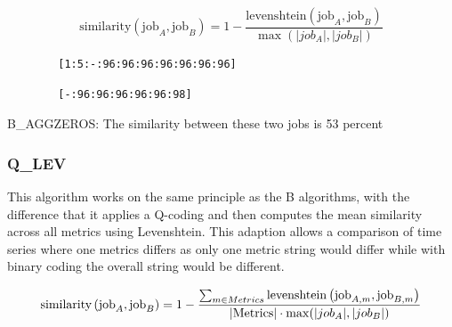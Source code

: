 \documentclass{jhps}
\begin{document}
\begin{equation}
	\text{similarity} \left(\text{job}_{A},\text{job}_{B} \right) =1- \frac{\text{levenshtein} \left(\text{job}_{A},\text{job}_{B} \right) }{\max \left( |job_{A}|,|job_{B}| \right) } \label{eq:sim:bin_aggzeros}
\end{equation}


\begin{listing}
	\noindent\begin{minipage}{0.49\textwidth}
		\begin{lstlisting}
		[1:5:-:96:96:96:96:96:96:96]
		\end{lstlisting}
		\vspace{-2em}
		\label{lst:sim:bin_aggzeros:job_a}
	\end{minipage}
	\noindent\begin{minipage}{0.49\textwidth}
		\begin{lstlisting}
		[-:96:96:96:96:96:98]
		\end{lstlisting}
		\vspace{-2em}
		\label{lst:sim:bin_aggzeros:job_b}
	\end{minipage}
	\caption{B\_AGGZEROS: The similarity between these two jobs is 53 percent}
	\label{lst:sim:bin_aggzeros}
\end{listing}

  \subsubsection{Q\_LEV}
This algorithm works on the same principle as the B algorithms, with the difference that it applies a Q-coding and then computes the mean similarity across all metrics using Levenshtein.
This adaption allows a comparison of time series where one metrics differs as only one metric string would differ while with binary coding the overall string would be different.

\begin{equation}
	\text{similarity}\left(\text{job}_{A},\text{job}_{B} \right) = 1 - \frac{ \sum_{m \in Metrics}^{} \text{levenshtein} \left(\text{job}_{A,m},\text{\text{job}}_{B,m} \right) }{|\text{Metrics}| \cdot \max(|job_A|, |job_{B}|)}
\end{equation}
\end{document}
